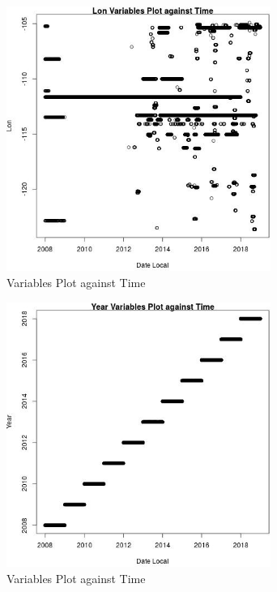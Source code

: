 \begin{figure} 
\centering  
\includegraphics[width=0.77\textwidth]{Code_Outputs/Report_PM25_Step4_part_e_de_duplicated_aves_ML_input_LonvDate_Local.jpg} 
\caption{\label{fig:Report_PM25_Step4_part_e_de_duplicated_aves_ML_inputLonvDate_Local}Variables Plot against Time} 
\end{figure} 
 

\begin{figure} 
\centering  
\includegraphics[width=0.77\textwidth]{Code_Outputs/Report_PM25_Step4_part_e_de_duplicated_aves_ML_input_YearvDate_Local.jpg} 
\caption{\label{fig:Report_PM25_Step4_part_e_de_duplicated_aves_ML_inputYearvDate_Local}Variables Plot against Time} 
\end{figure} 
 

